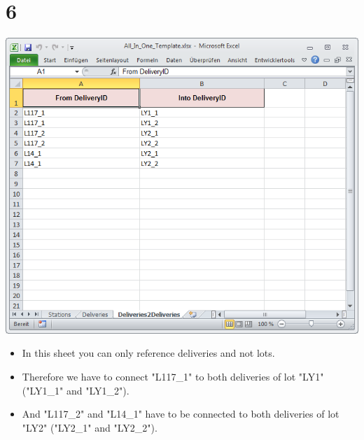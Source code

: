 \documentclass{beamer}
\begin{document}
\section{6}
\begin{frame}
	\begin{center}
  		\includegraphics[height=0.6\textheight]{6.png}
	\end{center}
	\begin{itemize}
		\item In this sheet you can only reference deliveries and not lots.
		\item Therefore we have to connect "L117\_1" to both deliveries of lot "LY1" ("LY1\_1" and "LY1\_2").
		\item And "L117\_2" and "L14\_1" have to be connected to both deliveries of lot "LY2" ("LY2\_1" and "LY2\_2").
	\end{itemize}
\end{frame}
\end{document}

